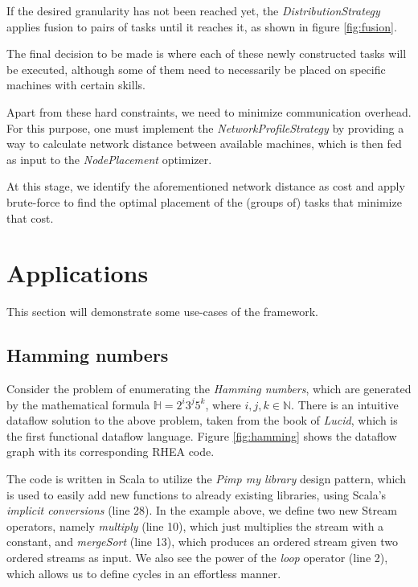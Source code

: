 \documentclass[sigplan,review,anonymous]{acmart}
\begin{document}
If the desired granularity has not been reached yet, the
\textit{DistributionStrategy} applies fusion to pairs of tasks until it reaches
it, as shown in figure \ref{fig:fusion}.


The final decision to be made is where each of these newly constructed tasks
will be executed, although some of them need to necessarily be placed on
specific machines with certain skills.

Apart from these hard constraints, we need to minimize communication overhead.
For this purpose, one must implement the \textit{NetworkProfileStrategy} by providing
a way to calculate network distance between available machines, which is then fed as input
to the \textit{NodePlacement} optimizer.

At this stage, we identify the aforementioned network distance as cost and apply
brute-force to find the optimal placement of the (groups of) tasks that minimize
that cost.

\section{Applications} \label{sec:applications}

This section will demonstrate some use-cases of the framework.

\subsection{Hamming numbers}

Consider the problem of enumerating the
\textit{Hamming numbers}, which are generated by the mathematical formula
$\mathbb{H} = 2^i3^j5^k$, where $i,j,k \in \mathbb{N}$. There is an intuitive
dataflow solution to the above problem, taken from the book of \textit{Lucid},
which is the first functional dataflow language\cite{lucid}. Figure
\ref{fig:hamming} shows the dataflow graph with its corresponding \textsc{RHEA}
code.


The code is written in Scala to utilize the \textit{Pimp my library} design
pattern\cite{pimp}, which is used to easily add new functions to already
existing libraries, using Scala's \textit{implicit conversions} (line 28). In
the example above, we define two new Stream operators, namely \textit{multiply}
(line 10), which just multiplies the stream with a constant, and
\textit{mergeSort} (line 13), which produces an ordered stream given two ordered
streams as input. We also see the power of the \textit{loop} operator (line 2),
which allows us to define cycles in an effortless manner.
\end{document}
